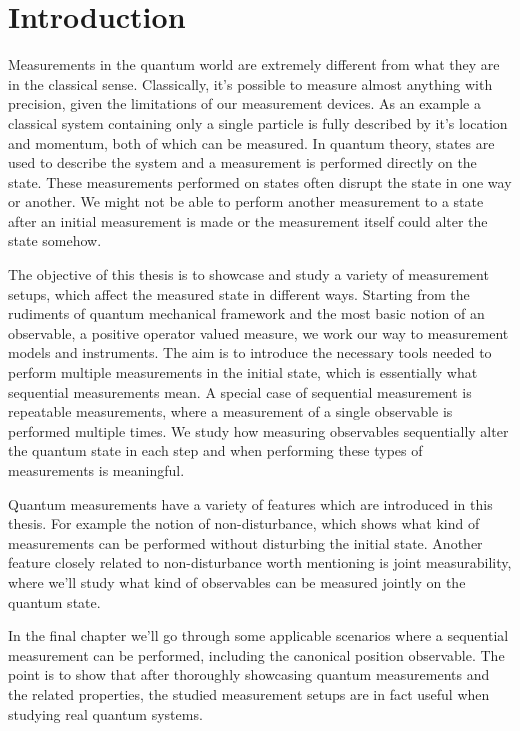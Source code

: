 \documentclass[a4paper,12pt]{wihuri}
\theoremstyle{definition}
\numberwithin{definition}{section}
\numberwithin{example}{section}
\numberwithin{theorem}{section}
\numberwithin{proposition}{section}
\numberwithin{lemma}{section}
\begin{document}

	


\tableofcontents %
\newpage
\section*{Introduction}
\thispagestyle{empty}
Measurements in the quantum world are extremely different from what they are in the classical sense. Classically, it's possible to measure almost anything with precision, given the limitations of our measurement devices. As an example a classical system containing only a single particle is fully described by it's location and momentum, both of which can be measured. In quantum theory, states are used to describe the system and a measurement is performed directly on the state. These measurements performed on states often disrupt the state in one way or another. We might not be able to perform another measurement to a state after an initial measurement is made or the measurement itself could alter the state somehow. 

The objective of this thesis is to showcase and study a variety of measurement setups, which affect the measured state in different ways. Starting from the rudiments of quantum mechanical framework and the most basic notion of an observable, a positive operator valued measure, we work our way to measurement models and instruments. The aim is to introduce the necessary tools needed to perform multiple measurements in the initial state, which is essentially what sequential measurements mean. A special case of sequential measurement is repeatable measurements, where a measurement of a single observable is performed multiple times. We study how measuring observables sequentially alter the quantum state in each step and when performing these types of measurements is meaningful.

Quantum measurements have a variety of features which are introduced in this thesis. For example the notion of non-disturbance, which shows what kind of measurements can be performed without disturbing the initial state. Another feature closely related to non-disturbance worth mentioning is joint measurability, where we'll study what kind of observables can be measured jointly on the quantum state. 

In the final chapter we'll go through some applicable scenarios where a sequential measurement can be performed, including the canonical position observable. The point is to show that after thoroughly showcasing quantum measurements and the related properties, the studied measurement setups are in fact useful when studying real quantum systems.
\end{document}

